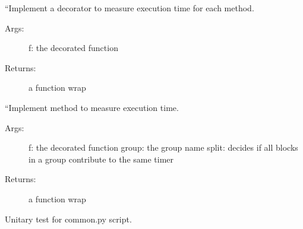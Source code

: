\documentclass[letterpaper,10pt,english]{sphinxmanual}
\begin{document}

\begin{fulllineitems}
\label{\detokenize{petgem/common:petgem.common.measure_all_class_methods}}
“Implement a decorator to measure execution time for each method.
\begin{description}
\item[{Args:}] \leavevmode
f: the decorated function

\item[{Returns:}] \leavevmode
a function wrap

\end{description}

\end{fulllineitems}


\begin{fulllineitems}
\label{\detokenize{petgem/common:petgem.common.measure_time}}
“Implement method to measure execution time.
\begin{description}
\item[{Args:}] \leavevmode
f: the decorated function
group: the group name
split: decides if all blocks in a group contribute to the same timer

\item[{Returns:}] \leavevmode
a function wrap

\end{description}

\end{fulllineitems}


\begin{fulllineitems}
\label{\detokenize{petgem/common:petgem.common.unitary_test}}
Unitary test for common.py script.

\end{fulllineitems}
\end{document}
